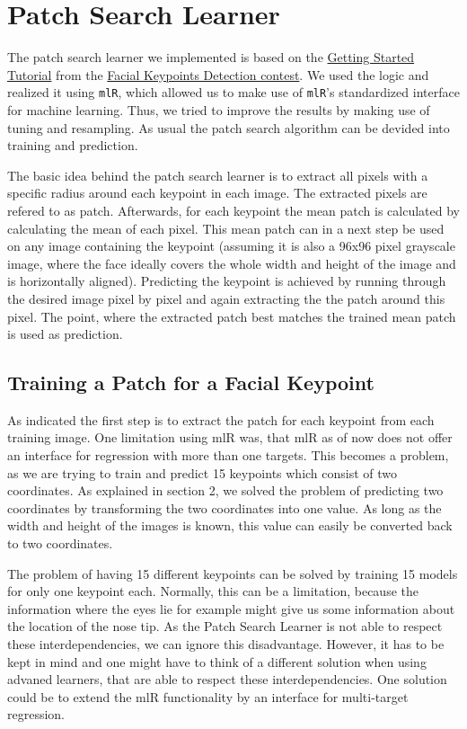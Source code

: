 \documentclass[]{article}
\begin{document}
\section{Patch Search Learner}\label{patch-search-learner}

The patch search learner we implemented is based on the
\href{https://www.kaggle.com/c/facial-keypoints-detection/details/getting-started-with-r}{Getting
Started Tutorial} from the
\href{https://www.kaggle.com/c/facial-keypoints-detection}{Facial
Keypoints Detection contest}. We used the logic and realized it using
\texttt{mlR}, which allowed us to make use of \texttt{mlR}'s
standardized interface for machine learning. Thus, we tried to improve
the results by making use of tuning and resampling. As usual the patch
search algorithm can be devided into training and prediction.

The basic idea behind the patch search learner is to extract all pixels
with a specific radius around each keypoint in each image. The extracted
pixels are refered to as patch. Afterwards, for each keypoint the mean
patch is calculated by calculating the mean of each pixel. This mean
patch can in a next step be used on any image containing the keypoint
(assuming it is also a 96x96 pixel grayscale image, where the face
ideally covers the whole width and height of the image and is
horizontally aligned). Predicting the keypoint is achieved by running
through the desired image pixel by pixel and again extracting the the
patch around this pixel. The point, where the extracted patch best
matches the trained mean patch is used as prediction.

\subsection{Training a Patch for a Facial
Keypoint}\label{patch-search-train}

As indicated the first step is to extract the patch for each keypoint
from each training image. One limitation using mlR was, that mlR as of
now does not offer an interface for regression with more than one
targets. This becomes a problem, as we are trying to train and predict
15 keypoints which consist of two coordinates. As explained in section
2, we solved the problem of predicting two coordinates by transforming
the two coordinates into one value. As long as the width and height of
the images is known, this value can easily be converted back to two
coordinates.

The problem of having 15 different keypoints can be solved by training
15 models for only one keypoint each. Normally, this can be a
limitation, because the information where the eyes lie for example might
give us some information about the location of the nose tip. As the
Patch Search Learner is not able to respect these interdependencies, we
can ignore this disadvantage. However, it has to be kept in mind and one
might have to think of a different solution when using advaned learners,
that are able to respect these interdependencies. One solution could be
to extend the mlR functionality by an interface for multi-target
regression.
\end{document}
